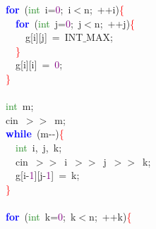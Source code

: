 \documentclass[10pt,a4paper,twoside]{article}
\begin{document}
{{{{{{{\mbox{}\ \ \ \ \textbf{\textcolor{Blue}{for}}\ \textcolor{BrickRed}{(}\textcolor{ForestGreen}{int}\ i\textcolor{BrickRed}{=}\textcolor{Purple}{0}\textcolor{BrickRed}{;}\ i\textcolor{BrickRed}{$<$}n\textcolor{BrickRed}{;}\ \textcolor{BrickRed}{++}i\textcolor{BrickRed}{)}\textcolor{Red}{\{} \\
\mbox{}\ \ \ \ \ \ \textbf{\textcolor{Blue}{for}}\ \textcolor{BrickRed}{(}\textcolor{ForestGreen}{int}\ j\textcolor{BrickRed}{=}\textcolor{Purple}{0}\textcolor{BrickRed}{;}\ j\textcolor{BrickRed}{$<$}n\textcolor{BrickRed}{;}\ \textcolor{BrickRed}{++}j\textcolor{BrickRed}{)}\textcolor{Red}{\{} \\
\mbox{}\ \ \ \ \ \ \ \ g\textcolor{BrickRed}{[}i\textcolor{BrickRed}{][}j\textcolor{BrickRed}{]}\ \textcolor{BrickRed}{=}\ INT$\_$MAX\textcolor{BrickRed}{;} \\
\mbox{}\ \ \ \ \ \ \textcolor{Red}{\}} \\
\mbox{}\ \ \ \ \ \ g\textcolor{BrickRed}{[}i\textcolor{BrickRed}{][}i\textcolor{BrickRed}{]}\ \textcolor{BrickRed}{=}\ \textcolor{Purple}{0}\textcolor{BrickRed}{;} \\
\mbox{}\ \ \ \ \textcolor{Red}{\}} \\
\mbox{} \\
\mbox{}\ \ \ \ \textcolor{ForestGreen}{int}\ m\textcolor{BrickRed}{;} \\
\mbox{}\ \ \ \ cin\ \textcolor{BrickRed}{$>>$}\ m\textcolor{BrickRed}{;} \\
\mbox{}\ \ \ \ \textbf{\textcolor{Blue}{while}}\ \textcolor{BrickRed}{(}m\textcolor{BrickRed}{-\/-)}\textcolor{Red}{\{} \\
\mbox{}\ \ \ \ \ \ \textcolor{ForestGreen}{int}\ i\textcolor{BrickRed}{,}\ j\textcolor{BrickRed}{,}\ k\textcolor{BrickRed}{;} \\
\mbox{}\ \ \ \ \ \ cin\ \textcolor{BrickRed}{$>>$}\ i\ \textcolor{BrickRed}{$>>$}\ j\ \textcolor{BrickRed}{$>>$}\ k\textcolor{BrickRed}{;} \\
\mbox{}\ \ \ \ \ \ g\textcolor{BrickRed}{[}i\textcolor{BrickRed}{-}\textcolor{Purple}{1}\textcolor{BrickRed}{][}j\textcolor{BrickRed}{-}\textcolor{Purple}{1}\textcolor{BrickRed}{]}\ \textcolor{BrickRed}{=}\ k\textcolor{BrickRed}{;} \\
\mbox{}\ \ \ \ \textcolor{Red}{\}} \\
\mbox{} \\
\mbox{}\ \ \ \ \textbf{\textcolor{Blue}{for}}\ \textcolor{BrickRed}{(}\textcolor{ForestGreen}{int}\ k\textcolor{BrickRed}{=}\textcolor{Purple}{0}\textcolor{BrickRed}{;}\ k\textcolor{BrickRed}{$<$}n\textcolor{BrickRed}{;}\ \textcolor{BrickRed}{++}k\textcolor{BrickRed}{)}\textcolor{Red}{\{} \\
}}}}}}}
\end{document}
